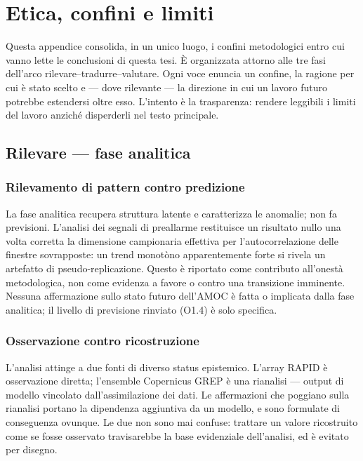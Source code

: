 
\chapter{Etica, confini e limiti}
\label{app:ethics}

Questa appendice consolida, in un unico luogo, i confini metodologici entro cui vanno lette le conclusioni di questa tesi. È organizzata attorno alle tre fasi dell'arco rilevare--tradurre--valutare. Ogni voce enuncia un confine, la ragione per cui è stato scelto e --- dove rilevante --- la direzione in cui un lavoro futuro potrebbe estendersi oltre esso. L'intento è la trasparenza: rendere leggibili i limiti del lavoro anziché disperderli nel testo principale.

\section{Rilevare --- fase analitica}
\label{app:limits-detect}

\subsection*{Rilevamento di pattern contro predizione}
La fase analitica recupera struttura latente e caratterizza le anomalie; non fa previsioni. L'analisi dei segnali di preallarme restituisce un risultato nullo una volta corretta la dimensione campionaria effettiva per l'autocorrelazione delle finestre sovrapposte: un trend monotòno apparentemente forte si rivela un artefatto di pseudo-replicazione. Questo è riportato come contributo all'onestà metodologica, non come evidenza a favore o contro una transizione imminente. Nessuna affermazione sullo stato futuro dell'AMOC è fatta o implicata dalla fase analitica; il livello di previsione rinviato (O1.4) è solo specifica.

\subsection*{Osservazione contro ricostruzione}
L'analisi attinge a due fonti di diverso status epistemico. L'array RAPID è osservazione diretta; l'ensemble Copernicus GREP è una rianalisi --- output di modello vincolato dall'assimilazione dei dati. Le affermazioni che poggiano sulla rianalisi portano la dipendenza aggiuntiva da un modello, e sono formulate di conseguenza ovunque. Le due non sono mai confuse: trattare un valore ricostruito come se fosse osservato travisarebbe la base evidenziale dell'analisi, ed è evitato per disegno.

